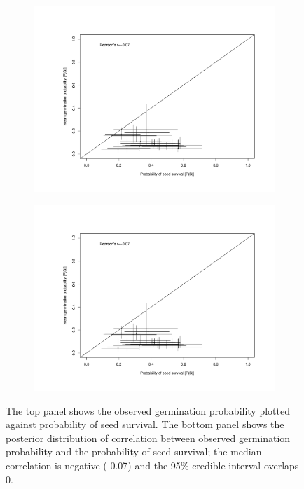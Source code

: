 \documentclass[12pt, oneside, titlepage]{article}   	%
\begin{document}
 \begin{figure}
\centering
\begin{subfigure}[h]{.65\textwidth}
\centering
       \includegraphics[page=1,width=1\textwidth]{../figures/germ_surv_correlation.pdf}  
\end{subfigure}
\begin{subfigure}[h]{.9\textwidth}
\centering
       \includegraphics[page=2,width=1\textwidth]{../figures/germ_surv_correlation.pdf}  
\end{subfigure}
 \caption{ The top panel shows the observed germination probability plotted against probability of seed survival. The bottom panel shows the posterior distribution of correlation between observed germination probability and the probability of seed survival; the median correlation is negative (-0.07) and the 95\% credible interval overlaps 0. }
  \label{fig:germ_surv_correlation}
 \end{figure}
\end{document}
